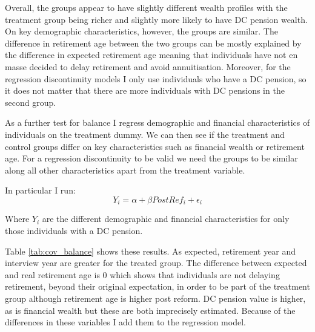 \documentclass[12pt]{article}
\begin{document}
Overall, the groups appear to have slightly different wealth profiles with the
treatment group being richer and slightly more likely to have DC pension wealth.
On key demographic characteristics, however, the groups are similar. The
difference in retirement age between the two groups can be mostly explained by
the difference in expected retirement age meaning that individuals have not en
masse decided to delay retirement and avoid annuitisation. Moreover, for the
regression discontinuity models I only use individuals who have a DC pension, so
it does not matter that there are more individuals with DC pensions in the
second group.

\begin{landscape}
    \linespread{1.25}
    
    \normalsize
\end{landscape}


As a further test for balance I regress demographic and financial
characteristics of individuals on the treatment dummy. We can then see if the
treatment and control groups differ on key characteristics such as financial
wealth or retirement age. For a regression discontinuity to be valid we need the
groups to be similar along all other characteristics apart from the treatment
variable.

In particular I run:
\begin{equation*}
    Y_{i} = \alpha + \beta PostRef_{i}  + \epsilon_{i}
\end{equation*}

Where $Y_{i}$ are the different demographic and financial characteristics for
only those individuals with a DC pension.

\linespread{1}

\linespread{1.5}

Table \ref{tab:cov_balance} shows these results. As expected, retirement year
and interview year are greater for the treated group. The difference between
expected and real retirement age is 0 which shows that individuals are not
delaying retirement, beyond their original expectation,  in order to be part of
the treatment group although retirement age is higher post reform. DC pension
value is higher, as is financial wealth but these are both imprecisely
estimated. Because of the differences in these variables I add them to the
regression model.
\end{document}
